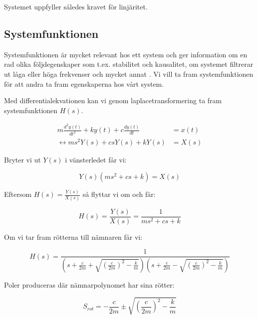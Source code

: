 \documentclass[10pt,a4paper]{article}
\begin{document}
Systemet uppfyller således kravet för linjäritet.





\subsection{Systemfunktionen}

Systemfunktionen är mycket relevant hos ett system och ger information om en rad olika följdegenskaper som t.ex. stabilitet och kausalitet, om systemet filtrerar ut låga eller höga frekvenser och mycket annat \cite[s.~170]{sune2000}. Vi vill ta fram systemfunktionen för att andra ta fram egenskaperna hos vårt system.

Med differentialekvationen kan vi genom laplacetransformering ta fram systemfunktionen $H(s)$. %

\begin{equation}
\begin{split}
 m\frac{d^2y(t)}{dt^2} + k  y(t) + c\frac{dy(t)}{dt} & = x(t) \\ \leftrightarrow m  s^2  Y(s) + c  s  Y(s) + k  Y(s) & = X(s)
\end{split}
\end{equation}

Bryter vi ut $Y(s)$ i vänsterledet får vi:

\begin{equation}
Y(s)(m  s^2 + c  s + k) = X(s)
\end{equation}

Eftersom $H(s) = \frac{Y(s)}{X(s)}$ så flyttar vi om och får:

\begin{equation}
H(s) = \frac{Y(s)}{X(s)} = \frac{1}{m s^2 + c  s + k}
\end{equation}

Om vi tar fram rötterna till nämnaren får vi:

\begin{equation}
H(s)= \frac{1}{(s + \frac{c}{2 m} + \sqrt{ (\frac{c}{2  m})^2 - \frac{k}{m}}) (s + \frac{c}{2  m} - \sqrt{ (\frac{c}{2  m})^2 - \frac{k}{m}})}
\end{equation}

Poler produceras där nämnarpolynomet har sina rötter:

\begin{equation}
S_{rot}=-\frac{c}{2m} \pm \sqrt{(\frac{c}{2m})^2-\frac{k}{m}}
\end{equation}
\end{document}
